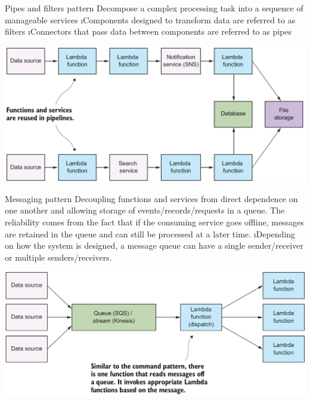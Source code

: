 \begin{frame}[allowframebreaks]{Pipes and filters pattern}
Decompose a complex processing task into a sequence of manageable services
\i Components designed to transform data are referred to as filters
\i Connectors that pass data between components are referred to as pipes

\includegraphics[width=.7\linewidth]{imgs/pattern_pipeline.PNG}
\end{frame}

\begin{frame}{Messaging pattern}
Decoupling functions and services from direct dependence on one another and allowing storage of events/records/requests in a queue. The reliability comes from the fact that if the consuming service goes offline, messages are retained in the queue and can still be processed at a later time.
\i Depending on how the system is designed, a message queue can have a single
sender/receiver or multiple senders/receivers.

\includegraphics[scale=.4]{imgs/pattern_messaging.PNG}
\end{frame}

